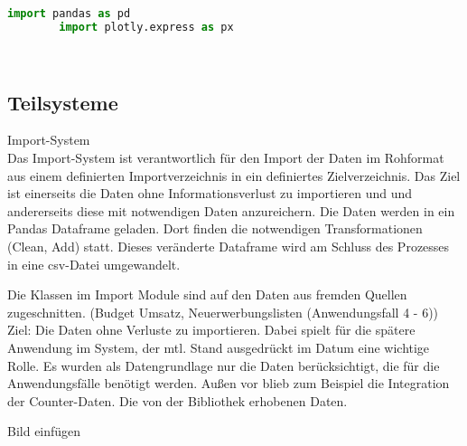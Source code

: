     \begin{lstlisting}[language=Python, caption=Python example]
        import pandas as pd
        import plotly.express as px

        
    \end{lstlisting}

    \subsection{Teilsysteme}
    
    Import-System\\
    Das Import-System ist verantwortlich für den Import der Daten im Rohformat aus einem definierten Importverzeichnis in ein definiertes Zielverzeichnis. Das Ziel
    ist einerseits die Daten ohne Informationsverlust zu importieren und und andererseits diese mit notwendigen Daten anzureichern. Die Daten werden in ein Pandas Dataframe
    geladen. Dort finden die notwendigen Transformationen (Clean, Add) statt. Dieses veränderte Dataframe wird am Schluss des Prozesses in eine csv-Datei umgewandelt.
    
    Die Klassen im Import Module sind auf den Daten aus fremden Quellen zugeschnitten.
    (Budget Umsatz, Neuerwerbungslisten (Anwendungsfall 4 - 6))
    Ziel: Die Daten ohne Verluste zu importieren. Dabei spielt für die spätere Anwendung im System, der mtl. Stand
    ausgedrückt im Datum eine wichtige Rolle.
    Es wurden als Datengrundlage nur die Daten berücksichtigt, die für die Anwendungsfälle benötigt werden.
    Außen vor blieb zum Beispiel die Integration der Counter-Daten.
    Die von der Bibliothek erhobenen Daten.
    
    
    Bild einfügen
    
